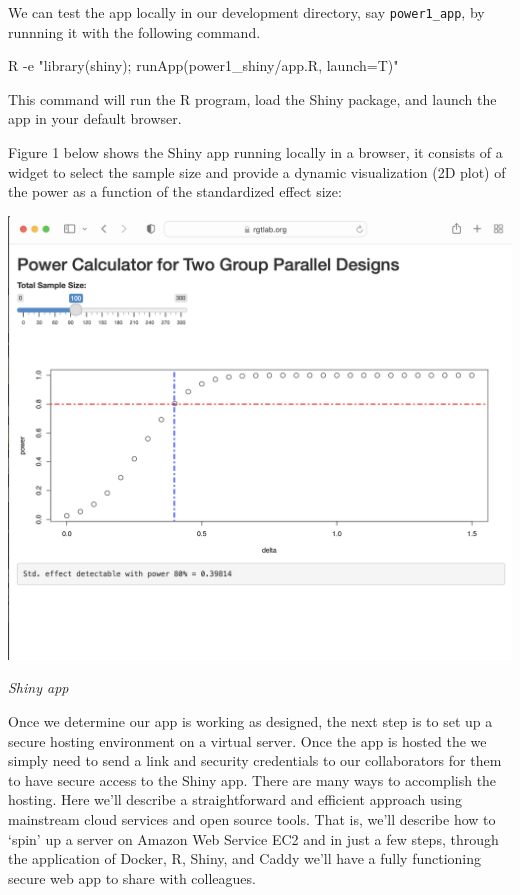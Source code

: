 \documentclass[
  letterpaper,
  DIV=11,
  numbers=noendperiod,
  oneside]{scrartcl}
\newenvironment{Shaded}{\begin{snugshade}}{\end{snugshade}}
\newcommand{\AttributeTok}[1]{\textcolor[rgb]{0.40,0.45,0.13}{#1}}
\newcommand{\ExtensionTok}[1]{\textcolor[rgb]{0.00,0.23,0.31}{#1}}
\newcommand{\StringTok}[1]{\textcolor[rgb]{0.13,0.47,0.30}{#1}}
\begin{document}
We can test the app locally in our development directory, say
\texttt{power1\_app}, by runnning it with the following command.

\begin{Shaded}
\begin{Highlighting}[]
\ExtensionTok{R} \AttributeTok{{-}e} \StringTok{"library(shiny); runApp(\textquotesingle{}power1\_shiny/app.R\textquotesingle{}, launch=T)"}
\end{Highlighting}
\end{Shaded}

This command will run the R program, load the Shiny package, and launch
the app in your default browser.

Figure 1 below shows the Shiny app running locally in a browser, it
consists of a widget to select the sample size and provide a dynamic
visualization (2D plot) of the power as a function of the standardized
effect size:

\begin{marginfigure}

{\centering \includegraphics{img/shinyapppower1.png}

}

\caption{\emph{Shiny app}}

\end{marginfigure}

Once we determine our app is working as designed, the next step is to
set up a secure hosting environment on a virtual server. Once the app is
hosted the we simply need to send a link and security credentials to our
collaborators for them to have secure access to the Shiny app. There are
many ways to accomplish the hosting. Here we'll describe a
straightforward and efficient approach using mainstream cloud services
and open source tools. That is, we'll describe how to `spin' up a server
on Amazon Web Service EC2 and in just a few steps, through the
application of Docker, R, Shiny, and Caddy we'll have a fully
functioning secure web app to share with colleagues.
\end{document}
